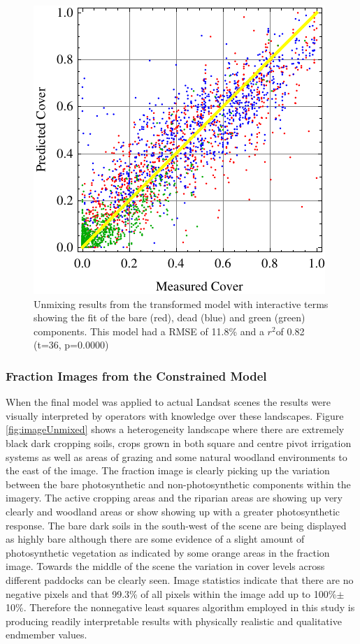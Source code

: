 \documentclass[remotesensing,article,accept,moreauthors,pdftex,12pt,a4paper]{mdpi}
\begin{document}
\begin{figure}
\includegraphics{nonLinearFitPlot.pdf}

\caption{\label{fig:nonLinearFit}Unmixing results from the transformed model with interactive terms showing the fit of the bare (red), dead (blue) and green (green) components. This model had a RMSE of 11.8\% and a $r^{2}$of 0.82 (t=36, p=0.0000)}

\end{figure} 



 \subsubsection{Fraction Images from the Constrained Model}

When the final model was applied to actual Landsat scenes the results were visually interpreted by operators with knowledge over these landscapes. Figure \ref{fig:imageUnmixed} shows a heterogeneity landscape where there are extremely black dark cropping soils, crops grown in both square and centre pivot irrigation systems as well as areas of grazing and some natural woodland environments to the east of the image. The fraction image is clearly picking up the variation between the bare photosynthetic and non-photosynthetic components within the imagery. The active cropping areas and the riparian areas are showing up very clearly and woodland areas or show showing up with a greater photosynthetic response. The bare dark soils in the south-west of the scene are being displayed as highly bare although there are some evidence of a slight amount of photosynthetic vegetation as indicated by some orange areas in the fraction image. Towards the middle of the scene the variation in cover levels across different paddocks can be clearly seen. Image statistics indicate that there are no negative pixels and that 99.3\% of all pixels within the image add up to 100\%$\pm$10\%. Therefore the nonnegative least squares algorithm employed in this study is producing readily interpretable results with physically realistic and qualitative endmember values.
\end{document}
